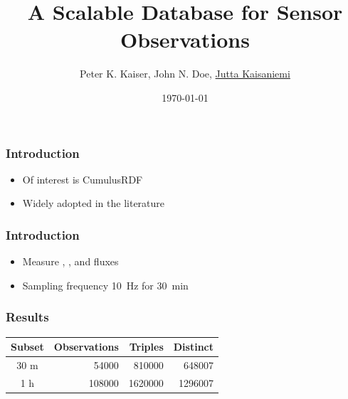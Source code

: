 \documentclass{beamer}
\title{A Scalable Database for Sensor Observations}
\author{Peter K. Kaiser, John N. Doe, \underline{Jutta Kaisaniemi}}
\date{\today}
\begin{document}
\maketitle

\begin{frame}
  \frametitle{Introduction}
  
  \begin{itemize}
  \item Of interest is CumulusRDF \cite{ladwig11cumulusrdf}
  \item Widely adopted in the literature \cite{phuoc11linked,lefort12qb}
  \end{itemize}
  
\end{frame}

\begin{frame}
  \frametitle{Introduction}
  
  \begin{itemize}
  \item Measure , , and  fluxes
  \item Sampling frequency \SI{10}{\hertz} for \SI{30}{\minute}
  \end{itemize}
  
\end{frame}

\begin{frame}
  \frametitle{Results}
  
	\centering
	\begin{tabular}{|c|r|r|r|}
		\hline
    Subset & Observations & Triples & Distinct \\
  	\hline
  	30 m & \num{54000} & \num{810000} & \num{648007} \\
  	1 h & \num{108000} & \num{1620000} & \num{1296007} \\
  	\hline 
  \end{tabular}
  
\end{frame}
\end{document}
